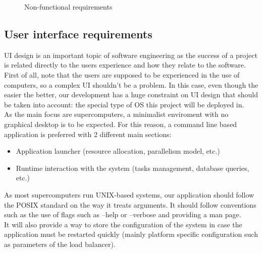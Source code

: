 \begin{figure}[ht!]
\begin{center}
\begin{tabular}{||c | c | p{7cm} | c||}
    \end{tabular}

  \end{center}

  \caption{Non-functional requirements}
  \label{non_functional:fig}
\end{figure}

\subsection{User interface requirements}

UI design is an important topic of software engineering as the success of a
project is related directly to the users experience and how they relate to the
software.\\

First of all, note that the users are supposed to be experienced in the use of
computers, so a complex UI shouldn't be a problem. In this case, even though
the easier the better, our development has a huge constraint on UI design that
should be taken into account: the special type of OS this project
will be deployed in.\\

As the main focus are supercomputers, a minimalist enviroment
with no graphical desktop is to be expected. For this reason, a
command line based application is preferred with 2 different main sections:\\
\begin{itemize}
  \item Application launcher (resource allocation, parallelism model, etc.)
  \item Runtime interaction with the system (tasks management, database
  queries, etc.)
\end{itemize}

As most supercomputers run UNIX-based systems, our application should follow
the POSIX\cite{POSIX_arguments} standard on the way it treats arguments.
It should follow conventions such as the use of flags such as --help or
--verbose and providing a man page.\\

It will also provide a way to store the configuration of the system in case
the application must be restarted quickly (mainly platform specific
configuration such as parameters of the load balancer). \\
